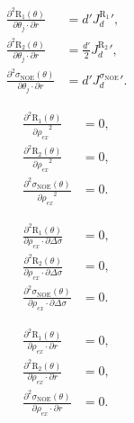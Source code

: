\documentclass[a4paper,11pt,twoside,openright]{book}
\def\lthtmlcheckvsize{\ifdim\ht\sizebox<\vsize 
  \ifdim\wd\sizebox<\hsize\expandafter\hfill\fi \expandafter\vfill
  \else\expandafter\vss\fi}%
\begin{document}
{\newpage\clearpage
\setcounter{equation}{49}
%
\begin{subequations}\begin{align}
\frac{\partial^2 \mathrm{R}_1(\theta)}{\partial \theta_j \cdot \partial r} &= d' {J_d^{\mathrm{R}_1}}',\\
\frac{\partial^2 \mathrm{R}_2(\theta)}{\partial \theta_j \cdot \partial r} &= \frac{d'}{2} {J_d^{\mathrm{R}_2}}',\\
\frac{\partial^2 \sigma_{\scriptscriptstyle \mathrm{NOE}}(\theta)}{\partial \theta_j \cdot \partial r} &= d' {J_d^{\sigma_{\scriptscriptstyle \mathrm{NOE}}}}'.\end{align}\end{subequations}%
\lthtmldisplayZ
\lthtmlcheckvsize\clearpage}

{\newpage\clearpage
\setcounter{equation}{50}
%
\begin{subequations}\begin{align}
\frac{\partial^2 \mathrm{R}_1(\theta)}{{\partial \rho_{ex}}^2} &= 0,\\
\frac{\partial^2 \mathrm{R}_2(\theta)}{{\partial \rho_{ex}}^2} &= 0,\\
\frac{\partial^2 \sigma_{\scriptscriptstyle \mathrm{NOE}}(\theta)}{{\partial \rho_{ex}}^2} &= 0.\end{align}\end{subequations}%
\lthtmldisplayZ
\lthtmlcheckvsize\clearpage}

{\newpage\clearpage
\setcounter{equation}{51}
%
\begin{subequations}\begin{align}
\frac{\partial^2 \mathrm{R}_1(\theta)}{\partial \rho_{ex} \cdot \partial \Delta\sigma} &= 0,\\
\frac{\partial^2 \mathrm{R}_2(\theta)}{\partial \rho_{ex} \cdot \partial \Delta\sigma} &= 0,\\
\frac{\partial^2 \sigma_{\scriptscriptstyle \mathrm{NOE}}(\theta)}{\partial \rho_{ex} \cdot \partial \Delta\sigma} &= 0.\end{align}\end{subequations}%
\lthtmldisplayZ
\lthtmlcheckvsize\clearpage}

{\newpage\clearpage
\setcounter{equation}{52}
%
\begin{subequations}\begin{align}
\frac{\partial^2 \mathrm{R}_1(\theta)}{\partial \rho_{ex} \cdot \partial r} &= 0,\\
\frac{\partial^2 \mathrm{R}_2(\theta)}{\partial \rho_{ex} \cdot \partial r} &= 0,\\
\frac{\partial^2 \sigma_{\scriptscriptstyle \mathrm{NOE}}(\theta)}{\partial \rho_{ex} \cdot \partial r} &= 0.\end{align}\end{subequations}%
\lthtmldisplayZ
\lthtmlcheckvsize\clearpage}
\end{document}
